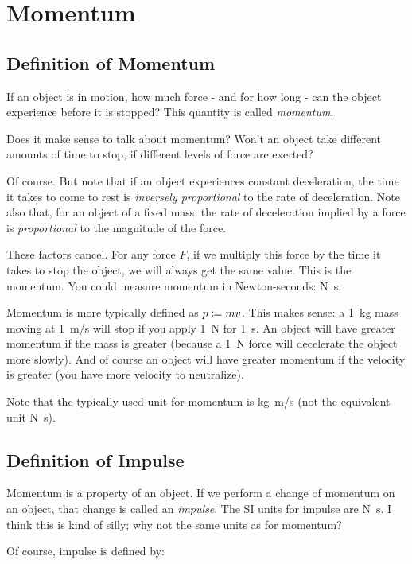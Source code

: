 \section{Momentum}

\subsection{Definition of Momentum}

If an object is in motion, how much force - and for how long - can the
object experience before it is stopped? This quantity is called
\emph{momentum}.

Does it make sense to talk about momentum? Won't an object take
different amounts of time to stop, if different levels of force are
exerted?

Of course. But note that if an object experiences constant deceleration,
the time it takes to come to rest is \emph{inversely proportional} to
the rate of deceleration. Note also that, for an object of a fixed mass,
the rate of deceleration implied by a force is \emph{proportional} to
the magnitude of the force.

These factors cancel. For any force $F$, if we multiply this force by
the time it takes to stop the object, we will always get the same value.
This is the momentum. You could measure momentum in Newton-seconds:
\si{N.s}.

Momentum is more typically defined as $p \coloneqq mv$. This makes sense:
a \SI{1}{kg} mass moving at \SI{1}{m/s} will stop if you apply \SI{1}{N}
for \SI{1}{s}. An object will have greater momentum if the mass is
greater (because a \SI{1}{N} force will decelerate the object more
slowly). And of course an object will have greater momentum if the
velocity is greater (you have more velocity to neutralize).

Note that the typically used unit for momentum is \si{kg.m/s} (not the
equivalent unit \si{N.s}).

\subsection{Definition of Impulse}

Momentum is a property of an object. If we perform a change of momentum
on an object, that change is called an \emph{impulse}. The SI units for
impulse are \si{N.s}. I think this is kind of silly; why not the same
units as for momentum?

Of course, impulse is defined by:

